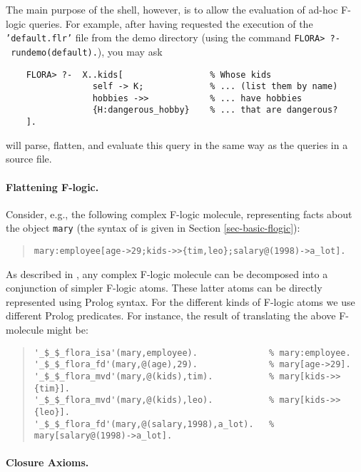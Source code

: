 \documentclass[11pt]{report}
\begin{document}
The main purpose of the \FLORA shell, however, is to allow the evaluation
of ad-hoc F-logic queries. For example, after having requested the
execution of the \texttt{'default.flr'} file from the demo directory (using
the command \texttt{FLORA>~?-~rundemo(default).}), you may ask
\begin{verbatim}
    FLORA> ?-  X..kids[                 % Whose kids
                 self -> K;             % ... (list them by name)
                 hobbies ->>            % ... have hobbies
                 {H:dangerous_hobby}    % ... that are dangerous?
    ]. 
\end{verbatim}
\FLORA will parse, flatten, and evaluate this query in the same way as
the queries in a source file.


\paragraph{Flattening F-logic.}

Consider, e.g., the following complex F-logic molecule, representing
facts about the object \texttt{mary} (the syntax of \fl is given in
Section \ref{sec-basic-flogic}):

\begin{quote}
{\small\begin{verbatim}
mary:employee[age->29;kids->>{tim,leo};salary@(1998)->a_lot].
\end{verbatim}}
\end{quote}

As described in \cite{KLW95}, any complex F-logic molecule can be
decomposed into a conjunction of simpler F-logic atoms. These latter atoms
can be directly represented using Prolog syntax.  For the different kinds
of F-logic atoms we use different Prolog predicates. For instance, the
result of translating the above F-molecule might be:

\begin{quote}
{\small
\begin{verbatim}
'_$_$_flora_isa'(mary,employee).              % mary:employee.
'_$_$_flora_fd'(mary,@(age),29).              % mary[age->29].
'_$_$_flora_mvd'(mary,@(kids),tim).           % mary[kids->>{tim}].
'_$_$_flora_mvd'(mary,@(kids),leo).           % mary[kids->>{leo}].
'_$_$_flora_fd'(mary,@(salary,1998),a_lot).   % mary[salary@(1998)->a_lot].
\end{verbatim}
  }
\end{quote}



\paragraph{Closure Axioms.}
\end{document}
